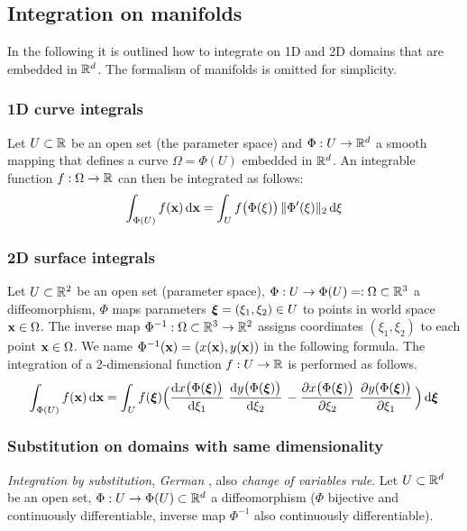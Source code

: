 \subsection{Integration on manifolds}
In the following it is outlined how to integrate on 1D and 2D domains that are embedded in $\mathbb{R}^d$. The formalism of manifolds is omitted for simplicity.

\subsubsection{1D curve integrals}
Let $U\subset \mathbb{R}$ be an open set (the parameter space) and $\Phi:U \to \mathbb{R}^d$ a smooth mapping that defines a curve $\Omega=\Phi(U)$ embedded in $\mathbb{R}^d$. An integrable function $f:\Omega \to \mathbb{R}$ can then be integrated as follows:
%
\begin{equation}
  \begin{array}{ll}
    \ds\int_{\Phi(U)} f(\bfx) \,\d\bfx = \int_{U} f\big(\Phi(\xi)\big)\,\Vert \Phi'(\xi)\Vert_2 \, \d \xi
  \end{array}
\end{equation}


\subsubsection{2D surface integrals}
Let $U \subset \mathbb{R}^2$ be an open set (parameter space), $\Phi:U \to \Phi(U)=:\Omega \subset\mathbb{R}^3$ a diffeomorphism, $\Phi$ maps parameters $\boldsymbol{\xi}=(\xi_1,\xi_2) \in U$ to points in world space $\textbf{x} \in \Omega$. The inverse map $\Phi^{-1} : \Omega \subset \mathbb{R}^3 \to \mathbb{R}^2$ assigns coordinates $(\xi_1,\xi_2)$ to each point $\textbf{x}\in\Omega$. We name $\Phi^{-1}(\textbf{x}) = (x(\textbf{x}),y(\textbf{x}))$ in the following formula. The integration of a 2-dimensional function $f:U\to\mathbb{R}$ is performed as follows.
%
\begin{equation}
  \begin{array}{ll}
    \ds\int_{\Phi(U)} f(\bfx) \,\d\bfx  = \ds\int_{U} f(\bfxi) \Big(\d{x\big(\Phi(\bfxi)\big)}{\xi_1}\,\d{y\big(\Phi(\bfxi)\big)}{\xi_2} - \p{x\big(\Phi(\bfxi)\big)}{\xi_2}\,\p{y(\Phi(\bfxi)\big)}{\xi_1}\Big) \,\d\bfxi
  \end{array}
\end{equation}

\subsubsection{Substitution on domains with same dimensionality}
\emph{Integration by substitution}, \textit{German }, also \emph{change of variables rule}.
Let $U \subset \mathbb{R}^d$ be an open set, $\Phi:U \to \Phi(U) \subset\mathbb{R}^d$ a diffeomorphism ($\Phi$ bijective and continuously differentiable, inverse map $\Phi^{-1}$ also continuously differentiable).

